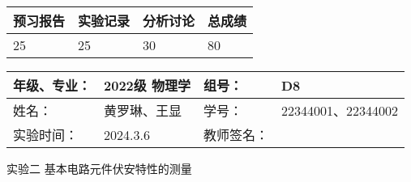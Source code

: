 \documentclass[dvipsnames, svgnames,a4paper,11pt]{article}
\begin{document}
	
	
	
	
	\begin{table}
		\renewcommand\arraystretch{1.7}
		\begin{tabularx}{\textwidth}{
				|X|X|X|X
				|X|X|X|X|}
			\hline
			\multicolumn{2}{|c|}{预习报告}&\multicolumn{2}{|c|}{实验记录}&\multicolumn{2}{|c|}{分析讨论}&\multicolumn{2}{|c|}{总成绩}\\
			\hline
			\LARGE25 & & \LARGE25 & & \LARGE30 & & \LARGE80 & \\
			\hline
		\end{tabularx}
	\end{table}
	
	\begin{table}
		\renewcommand\arraystretch{1.7}
		\begin{tabularx}{\textwidth}{|X|X|X|X|}
			\hline
			年级、专业： & 2022级 物理学 &组号： & D8\\
			\hline
			姓名： & 黄罗琳、王显 & 学号： & 22344001、22344002\\
			\hline
			实验时间： & 2024.3.6 & 教师签名： & \\
			\hline
		\end{tabularx}
	\end{table}
	
	\begin{center}
		\LARGE 实验二  \quad 基本电路元件伏安特性的测量
	\end{center}
	
	
\end{document}
